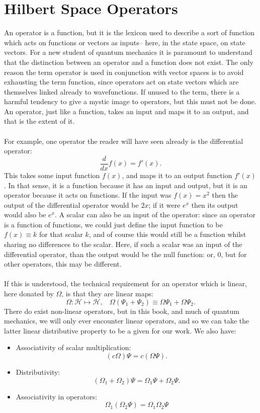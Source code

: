 \section{Hilbert Space Operators}
An operator is a function, but it is the lexicon used to describe a sort of function which acts on functions or vectors as inputs-- here, in the state space, on state vectors. For a new student of quantum mechanics it is paramount to understand that the distinction between an operator and a function does not exist. The only reason the term operator is used in conjunction with vector spaces is to avoid exhausting the term function, since operators act on state vectors which are themselves linked already to wavefunctions. If unused to the term, there is a harmful tendency to give a mystic image to operators, but this must not be done. An operator, just like a function, takes an input and maps it to an output, and that is the extent of it. 
\\\\
For example, one operator the reader will have seen already is the differential operator:
$$
\frac{d}{dx}f(x)=f'(x).
$$
This takes some input function $f(x)$, and maps it to an output function $f'(x)$. In that sense, it is a function because it has an input and output, but it is an operator because it acts on functions. If the input was $f(x)=x^2$ then the output of the differential operator would be $2x$; if it were $e^x$ then its output would also be $e^x$. A scalar can also be an input of the operator: since an operator is a function of functions, we could just define the input function to be $f(x)\equiv k$ for that scalar $k$, and of course this would still be a function whilst sharing no differences to the scalar. Here, if such a scalar was an input of the differential operator, than the output would be the null function: or, $0$, but for other operators, this may be different.
\\\\
If this is understood, the technical requirement for an operator which is linear, here donated by $\Omega$, is that they are linear maps:
$$
\Omega: \mathscr{H} \mapsto \mathscr{H},\:\:\:\: \Omega(\Psi_{1}+\Psi_{2})\equiv \Omega\Psi_{1}+\Omega\Psi_{2}.
$$
There do exist non-linear operators, but in this book, and much of quantum mechanics, we will only ever encounter linear operators, and so we can take the latter linear distributive property to be a given for our work. We also have:
\begin{itemize}
    \item Associativity of scalar multiplication:
    $$
    (c\Omega)\Psi=c(\Omega\Psi).
    $$
    \item Distributivity:
    $$
    (\Omega_{1}+\Omega_{2})\Psi=\Omega_{1}\Psi + \Omega_{2}\Psi.
    $$
    \item Associativity in operators:
    $$
    \Omega_{1}(\Omega_{2}\Psi)=\Omega_{1}\Omega_{2}\Psi
    $$
\end{itemize}
